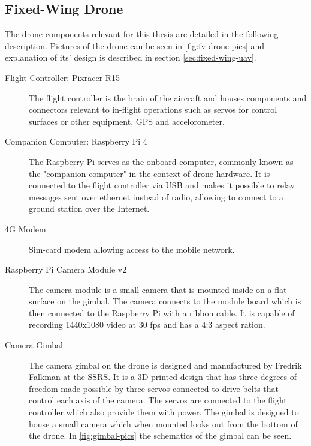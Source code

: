 \documentclass[nofilelist]{cslthse-msc}
\begin{document}
\subsection{Fixed-Wing Drone}
\label{sec:uav-components}
The drone components relevant for this thesis are detailed in the following description. Pictures of the drone can be seen in \ref{fig:fv-drone-pics} and explanation of its' design is described in section \ref{sec:fixed-wing-uav}.

\begin{description}
   \item[Flight Controller: Pixracer R15] The flight controller is the brain of the aircraft and houses components and connectors relevant to in-flight operations such as servos for control surfaces or other equipment, GPS and accelorometer.

   \item[Companion Computer: Raspberry Pi 4] The Raspberry Pi serves as the onboard computer, commonly known as the "companion computer" in the context of drone hardware. It is connected to the flight controller via USB and makes it possible to relay messages sent over ethernet instead of radio, allowing to connect to a ground station over the Internet. 
   
   \item[4G Modem] Sim-card modem allowing access to the mobile network. 
   
   \item[Raspberry Pi Camera Module v2] The camera module is a small camera that is mounted inside on a flat surface on the gimbal. The camera connects to the module board which is then connected to the Raspberry Pi with a ribbon cable. It is capable of recording 1440x1080 video at 30 fps and has a 4:3 aspect ration. 

   \item[Camera Gimbal] The camera gimbal on the drone is designed and manufactured by Fredrik Falkman at the SSRS. It is a 3D-printed design that has three degrees of freedom made possible by three servos connected to drive belts that control each axis of the camera. The servos are connected to the flight controller which also provide them with power. The gimbal is designed to house a small camera which when mounted looks out from the bottom of the drone. In \ref{fig:gimbal-pics} the schematics of the gimbal can be seen. 
   

\end{description}
\end{document}

